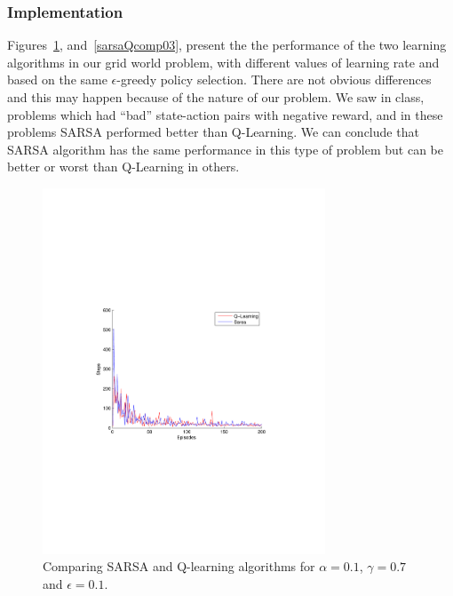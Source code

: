 \documentclass[a4paper,11pt]{article}
\begin{document}
\subsubsection*{Implementation}
Figures~\ref{sarsaQcomp01}, and~\ref{sarsaQcomp03}, present the the performance of the two learning algorithms in our grid world problem, with different values of learning rate and based on the same $\epsilon $-greedy policy selection. There are not obvious differences and this may happen because of the nature of our problem. We saw in class, problems which had ``bad'' state-action pairs with negative reward, and in these problems SARSA performed better than Q-Learning. We can conclude that SARSA algorithm has the same performance in this type of problem but can be better or worst than Q-Learning in others.

\begin{figure}[t!]
  \centering
    \includegraphics[trim=4cm 8.5cm 4cm 8.5cm,clip,width=0.75\textwidth]{figures/sarsaQcomp01.pdf}
    \caption{Comparing SARSA and Q-learning algorithms for $\alpha = 0.1$, $\gamma = 0.7$ and $\epsilon = 0.1$.}
    \label{sarsaQcomp01}
\end{figure}
\end{document}
